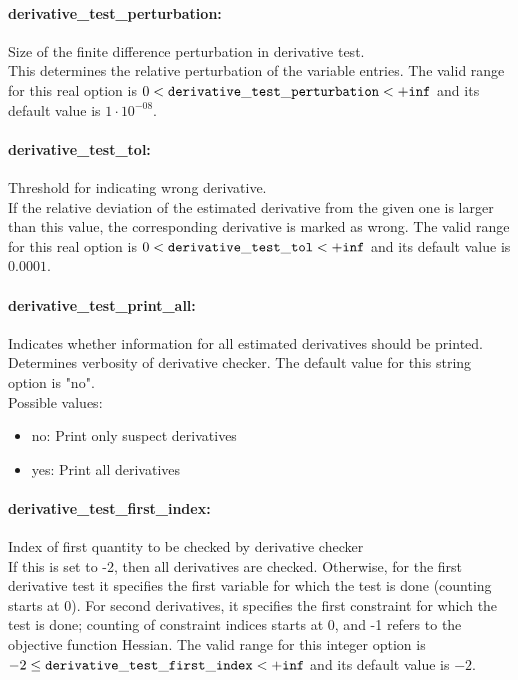 \paragraph{derivative\_test\_perturbation:}\label{opt:derivative_test_perturbation} Size of the finite difference perturbation in derivative test. \\
 This determines the relative perturbation of the
variable entries. The valid range for this real option is 
$0 <  {\tt derivative\_test\_perturbation } <  {\tt +inf}$
and its default value is $1 \cdot 10^{-08}$.


\paragraph{derivative\_test\_tol:}\label{opt:derivative_test_tol} Threshold for indicating wrong derivative. \\
 If the relative deviation of the estimated
derivative from the given one is larger than this
value, the corresponding derivative is marked as
wrong. The valid range for this real option is 
$0 <  {\tt derivative\_test\_tol } <  {\tt +inf}$
and its default value is $0.0001$.


\paragraph{derivative\_test\_print\_all:}\label{opt:derivative_test_print_all} Indicates whether information for all estimated derivatives should be printed. \\
 Determines verbosity of derivative checker. The default value for this string option is "no".
\\ 
Possible values:
\begin{itemize}
   \item no: Print only suspect derivatives
   \item yes: Print all derivatives
\end{itemize}

\paragraph{derivative\_test\_first\_index:}\label{opt:derivative_test_first_index} Index of first quantity to be checked by derivative checker \\
 If this is set to -2, then all derivatives are
checked.  Otherwise, for the first derivative
test it specifies the first variable for which
the test is done (counting starts at 0).  For
second derivatives, it specifies the first
constraint for which the test is done; counting
of constraint indices starts at 0, and -1 refers
to the objective function Hessian. The valid range for this integer option is
$-2 \le {\tt derivative\_test\_first\_index } <  {\tt +inf}$
and its default value is $-2$.


